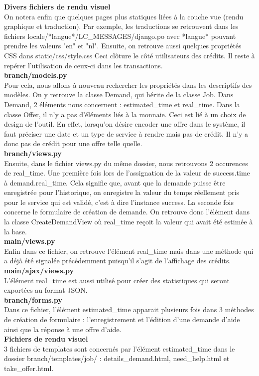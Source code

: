 \textbf{Divers fichiers de rendu visuel}
\\%
On notera enfin que quelques pages plus statiques liées à la couche vue (rendu graphique et traduction).  Par exemple,  les traductions se retrouvent dans les fichiers locale/*langue*/LC\_MESSAGES/django.po avec *langue* pouvant prendre les valeurs "en" et "nl".  Ensuite,  on retrouve aussi quelques propriétés CSS dans static/css/style.css 
\newline
Ceci clôture le côté utilisateurs des crédits.  Il reste à repérer l'utilisation de ceux-ci dans les transactions.  
\\
\textbf{branch/models.py}
\\%
Pour cela,  nous allons à nouveau rechercher les propriétés dans les descriptifs des modèles. 
On y retrouve la classe Demand,  qui hérite de la classe Job.  Dans Demand,  2 éléments nous concernent : estimated\_time et real\_time.  
Dans la classe Offer,  il n'y a pas d'éléments liés à la monnaie.  Ceci est lié à un choix de design de l'outil.  En effet,   lorsqu'on désire encoder une offre dans le système,  il faut préciser une date et un type de service à rendre mais pas de crédit.  Il n'y a donc pas de crédit pour une offre telle quelle.
\\
\textbf{branch/views.py}
\\%
Ensuite,  dans le fichier views.py du même dossier,   nous retrouvons 2 occurences de real\_time.  
Une première fois lors de l'assignation de la valeur de success.time à demand.real\_time.  Cela signifie que,  avant que la demande puisse être enregistrée pour l'historique,  on enregistre la valeur du temps réellement pris pour le service qui est validé,  c'est à dire l'instance success.
La seconde fois concerne le formulaire de création de demande.  On retrouve donc l'élément dans la classe CreateDemandView où real\_time reçoit la valeur qui avait été estimée à la base.  
\\
\textbf{main/views.py}
\\%
Enfin dans ce fichier,  on retrouve l'élément real\_time mais dans une méthode qui a déjà été signalée précédemment puisqu'il s'agit de l'affichage des crédits.
\\
\textbf{main/ajax/views.py}
\\%
L'élément real\_time est aussi utilisé pour créer des statistiques qui seront exportées au format JSON.
\\
\textbf{branch/forms.py}
\\%
Dans ce fichier,   l'élément estimated\_time apparait plusieurs fois dans 3 méthodes de création de formulaire : l'enregistrement et l'édition d'une demande d'aide ainsi que la réponse à une offre d'aide.
\\
\textbf{Fichiers de rendu visuel}
\\%
3 fichiers de templates sont concernés par l'élément estimated\_time dans le dossier branch/templates/job/ : details\_demand.html,  need\_help.html et take\_offer.html.

